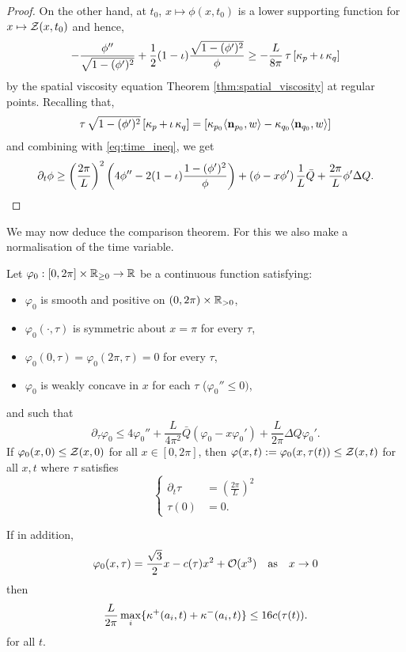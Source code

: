 \documentclass[12pt]{amsart}
\begin{document}
\begin{proof}
On the other hand, at $t_0$, $x \mapsto \phi(x, t_0)$ is a lower supporting function for $x \mapsto \operatorname{\mathcal{Z}}(x, t_0)$ and hence,
\begin{equation}
\label{eq:spatial_inequality}
-\frac{\phi''}{\sqrt{1-(\phi')^2}} + \frac{1}{2} (1-\operatorname{\iota}) \frac{\sqrt{1 - (\phi')^2}}{\phi} \geq -\frac{L}{8\pi} \operatorname{\tau} \left[\operatorname{\kappa}_p + \operatorname{\iota} \operatorname{\kappa}_q\right]
\end{equation}
by the spatial viscosity equation Theorem \ref{thm:spatial_viscosity} at regular points. Recalling that,
\[
\operatorname{\tau} \sqrt{1 - (\phi')^2} \left[\operatorname{\kappa}_p + \operatorname{\iota} \operatorname{\kappa}_q\right] = \left[\operatorname{\kappa}_{p_0} \langle{\operatorname{\mathbf{n}}_{p_0}},{w}\rangle - \operatorname{\kappa}_{q_0} \langle{\operatorname{\mathbf{n}}_{q_0}},{w}\rangle\right]
\]
and combining with \eqref{eq:time_ineq}, we get
\[
\partial_t \phi \geq \left(\frac{2\pi}{L}\right)^2 \left(4 \phi'' - 2 (1-\operatorname{\iota}) \frac{1 - (\phi')^2}{\phi}\right) + \left(\phi - x \phi'\right) \frac{1}{L} \bar{Q} + \frac{2\pi}{L} \phi' \Delta Q.
\]
\end{proof}

We may now deduce the comparison theorem. For this we also make a normalisation of the time variable.

\begin{theorem}
\label{thm:comparison}

Let $\varphi_0 : [0, 2\pi] \times \mathbb{R}_{\geq 0} \to \mathbb{R}$ be a continuous function satisfying:
\begin{itemize}
\item $\varphi_0$ is smooth and positive on $(0, 2\pi) \times \mathbb{R}_{>0}$,
\item $\varphi_0(\cdot, \tau)$ is symmetric about $x = \pi$ for every $\tau$,
\item $\varphi_0(0, \tau) = \varphi_0(2\pi, \tau) = 0$ for every $\tau$,
\item $\varphi_0$ is weakly concave in $x$ for each $\tau$ ($\varphi_0'' \leq 0)$,
\end{itemize}
and such that
\begin{equation}
\label{eq:comparison_ineq}
\partial_{\tau} \varphi_0 \leq 4 \varphi_0'' + \frac{L}{4\pi^2} \bar{Q} (\varphi_0 - x \varphi_0') + \frac{L}{2\pi} \Delta Q \varphi_0'.
\end{equation}
If $\varphi_0(x, 0) \leq \operatorname{\mathcal{Z}}(x, 0)$ for all $x \in [0, 2\pi]$, then $\varphi(x, t) := \varphi_0(x, \tau(t)) \leq \operatorname{\mathcal{Z}}(x, t)$ for all $x, t$ where $\tau$ satisfies
\[
\begin{cases}
\partial_t \tau &= \left(\frac{2\pi}{L}\right)^2 \\
\tau(0) &= 0.
\end{cases}
\]

If in addition,
\[
\varphi_0(x, \tau) = \frac{\sqrt{3}}{2} x - c(\tau) x^2 + \operatorname{\mathcal{O}}(x^3) \quad \text{as} \quad x \to 0
\]
then
\[
\frac{L}{2\pi} \max_i \{\operatorname{\kappa}^+(a_i, t) + \operatorname{\kappa}^-(a_i, t)\} \leq 16 c(\tau(t)).
\]
for all $t$.
\end{theorem}
\end{document}
